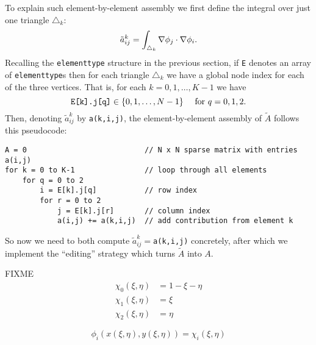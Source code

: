To explain such element-by-element assembly we first define the integral over just one triangle $\triangle_k$:
    $$\tilde a_{ij}^k = \int_{\triangle_k} \nabla \phi_j \cdot \nabla \phi_i.$$
Recalling the \texttt{elementtype} structure in the previous section, if \texttt{E} denotes an array of \texttt{elementtype}s then for each triangle $\triangle_k$ we have a global node index for each of the three vertices.  That is, for each $k=0,1,\dots,K-1$ we have
    $$\text{\texttt{E[k].j[q]}} \in \{0,1,\dots,N-1\} \quad \text{ for } q = 0,1,2.$$
Then, denoting $\tilde a_{ij}^k$ by \texttt{a(k,i,j)}, the element-by-element assembly of $\tilde A$ follows this pseudocode:
\begin{Verbatim}[fontsize=\small]
A = 0                           // N x N sparse matrix with entries a(i,j)
for k = 0 to K-1                // loop through all elements
    for q = 0 to 2
        i = E[k].j[q]           // row index
        for r = 0 to 2
            j = E[k].j[r]       // column index
            a(i,j) += a(k,i,j)  // add contribution from element k
\end{Verbatim}
\medskip\noindent
So now we need to both compute $\tilde a_{ij}^k= $\texttt{a(k,i,j)} concretely, after which we implement the ``editing'' strategy which turns $\tilde A$ into $A$.


FIXME
\begin{align*}
\chi_0(\xi,\eta) &= 1-\xi-\eta \\
\chi_1(\xi,\eta) &= \xi \\
\chi_2(\xi,\eta) &= \eta
\end{align*}

$$\phi_i(x(\xi,\eta),y(\xi,\eta)) = \chi_i(\xi,\eta)$$

